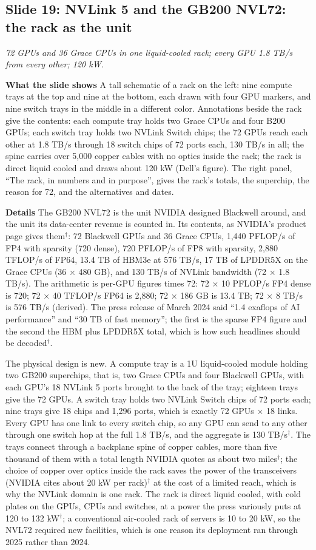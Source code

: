 \documentclass[11pt,letterpaper]{article}
\newcommand{\slide}[3]{%
  \subsection[Slide #1: #2]{Slide #1: #2}%
  {\color{muted}\itshape #3\par}\medskip}
\newcommand{\para}[1]{\medskip\noindent\textbf{#1}\quad}
\begin{document}

\slide{19}{NVLink 5 and the GB200 NVL72: the rack as the unit}{72 GPUs and 36 Grace CPUs in one liquid-cooled rack; every GPU 1.8 TB/s from every other; 120 kW.}

\para{What the slide shows} A tall schematic of a rack on the left: nine compute trays at the top and nine at the bottom, each drawn with four GPU markers, and nine switch trays in the middle in a different color. Annotations beside the rack give the contents: each compute tray holds two Grace CPUs and four B200 GPUs; each switch tray holds two NVLink Switch chips; the 72 GPUs reach each other at 1.8 TB/s through 18 switch chips of 72 ports each, 130 TB/s in all; the spine carries over 5{,}000 copper cables with no optics inside the rack; the rack is direct liquid cooled and draws about 120 kW (Dell's figure). The right panel, ``The rack, in numbers and in purpose'', gives the rack's totals, the superchip, the reason for 72, and the alternatives and dates.

\para{Details} The GB200 NVL72 is the unit NVIDIA designed Blackwell around, and the unit its data-center revenue is counted in. Its contents, as NVIDIA's product page gives them$^\dagger$: 72 Blackwell GPUs and 36 Grace CPUs, 1{,}440 PFLOP/s of FP4 with sparsity (720 dense), 720 PFLOP/s of FP8 with sparsity, 2{,}880 TFLOP/s of FP64, 13.4 TB of HBM3e at 576 TB/s, 17 TB of LPDDR5X on the Grace CPUs (36 $\times$ 480 GB), and 130 TB/s of NVLink bandwidth (72 $\times$ 1.8 TB/s). The arithmetic is per-GPU figures times 72: 72 $\times$ 10 PFLOP/s FP4 dense is 720; 72 $\times$ 40 TFLOP/s FP64 is 2{,}880; 72 $\times$ 186 GB is 13.4 TB; 72 $\times$ 8 TB/s is 576 TB/s (derived). The press release of March 2024 said ``1.4 exaflops of AI performance'' and ``30 TB of fast memory''; the first is the sparse FP4 figure and the second the HBM plus LPDDR5X total, which is how such headlines should be decoded$^\dagger$.

The physical design is new. A compute tray is a 1U liquid-cooled module holding two GB200 superchips, that is, two Grace CPUs and four Blackwell GPUs, with each GPU's 18 NVLink 5 ports brought to the back of the tray; eighteen trays give the 72 GPUs. A switch tray holds two NVLink Switch chips of 72 ports each; nine trays give 18 chips and 1{,}296 ports, which is exactly 72 GPUs $\times$ 18 links. Every GPU has one link to every switch chip, so any GPU can send to any other through one switch hop at the full 1.8 TB/s, and the aggregate is 130 TB/s$^\dagger$. The trays connect through a backplane spine of copper cables, more than five thousand of them with a total length NVIDIA quotes as about two miles$^\dagger$; the choice of copper over optics inside the rack saves the power of the transceivers (NVIDIA cites about 20 kW per rack)$^\dagger$ at the cost of a limited reach, which is why the NVLink domain is one rack. The rack is direct liquid cooled, with cold plates on the GPUs, CPUs and switches, at a power the press variously puts at 120 to 132 kW$^\dagger$; a conventional air-cooled rack of servers is 10 to 20 kW, so the NVL72 required new facilities, which is one reason its deployment ran through 2025 rather than 2024.
\end{document}
